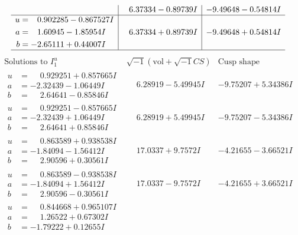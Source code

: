 \documentclass[1p]{elsarticle_modified}
\theoremstyle{definition}
\newcommand{\I}{\sqrt{-1}}
\begin{document}
$$\begin{array}{c|c|c}
 & \phantom{-}6.37334 - 0.89739 I & -9.49648 - 0.54814 I \\ \hline\begin{aligned}
u &= \phantom{-}0.902285 - 0.867527 I \\
a &= \phantom{-}1.60945 - 1.85954 I \\
b &= -2.65111 + 0.44007 I\end{aligned}
 & \phantom{-}6.37334 + 0.89739 I & -9.49648 + 0.54814 I\\
 \hline 
 \end{array}$$\newpage$$\begin{array}{c|c|c}  
\text{Solutions to }I^u_{1}& \I (\text{vol} + \sqrt{-1}CS) & \text{Cusp shape}\\
 \hline 
\begin{aligned}
u &= \phantom{-}0.929251 + 0.857665 I \\
a &= -2.32439 - 1.06449 I \\
b &= \phantom{-}2.64641 - 0.85846 I\end{aligned}
 & \phantom{-}6.28919 - 5.49945 I & -9.75207 + 5.34386 I \\ \hline\begin{aligned}
u &= \phantom{-}0.929251 - 0.857665 I \\
a &= -2.32439 + 1.06449 I \\
b &= \phantom{-}2.64641 + 0.85846 I\end{aligned}
 & \phantom{-}6.28919 + 5.49945 I & -9.75207 - 5.34386 I \\ \hline\begin{aligned}
u &= \phantom{-}0.863589 + 0.938538 I \\
a &= -1.84094 - 1.56412 I \\
b &= \phantom{-}2.90596 + 0.30561 I\end{aligned}
 & \phantom{-}17.0337 + 9.7572 I & -4.21655 - 3.66521 I \\ \hline\begin{aligned}
u &= \phantom{-}0.863589 - 0.938538 I \\
a &= -1.84094 + 1.56412 I \\
b &= \phantom{-}2.90596 - 0.30561 I\end{aligned}
 & \phantom{-}17.0337 - 9.7572 I & -4.21655 + 3.66521 I \\ \hline\begin{aligned}
u &= \phantom{-}0.844668 + 0.965107 I \\
a &= \phantom{-}1.26522 + 0.67302 I \\
b &= -1.79222 + 0.12655 I\end{aligned}

\end{array}$$
\end{document}
